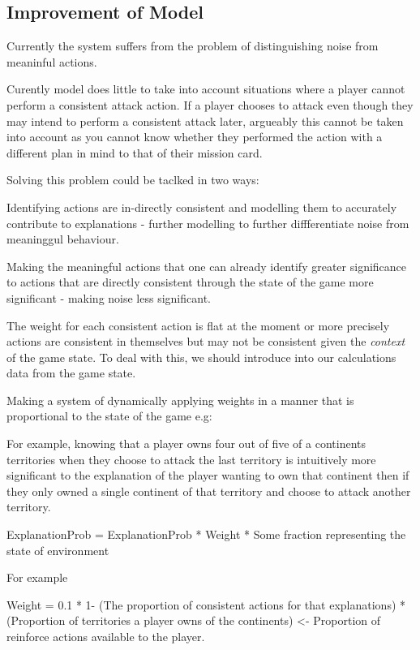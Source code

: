 \documentclass[parskip]{cs4rep}
\begin{document}
\subsection{Improvement of Model}

Currently the system suffers from the problem of distinguishing noise from meaninful actions.

Curently model does little to take into account situations where a player cannot perform a consistent attack action. If a player chooses to attack even though they may intend to perform a consistent attack later, argueably this cannot be taken into account as you cannot know whether they performed the action with a different plan in mind to that of their mission card.

Solving this problem could be taclked in two ways:

Identifying actions are in-directly consistent and modelling them to accurately contribute to explanations - further modelling to further diffferentiate noise from meaninggul behaviour.
 
Making the meaningful actions that one can already identify greater significance to actions that are directly consistent through the state of the game  more significant - making noise less significant.

The weight for each consistent action is flat at the moment or more precisely actions are consistent in themselves but may not be consistent given the \textit{context} of the game state. To deal with this, we should introduce into our calculations data from the game state.

Making a system of dynamically applying weights in a manner that is proportional to the state of the game e.g:

For example, knowing that a player owns four out of five of a continents territories when they choose to attack the last territory is intuitively more significant to the explanation of the player wanting to own that continent then if they only owned a single continent of that territory and choose to attack another territory.

ExplanationProb = ExplanationProb * Weight * Some fraction representing the state of environment

For example

Weight = 0.1 * 1- (The proportion of consistent actions for that explanations) * (Proportion of territories a player owns of the continents) <- Proportion of reinforce actions available to the player.
\end{document}
